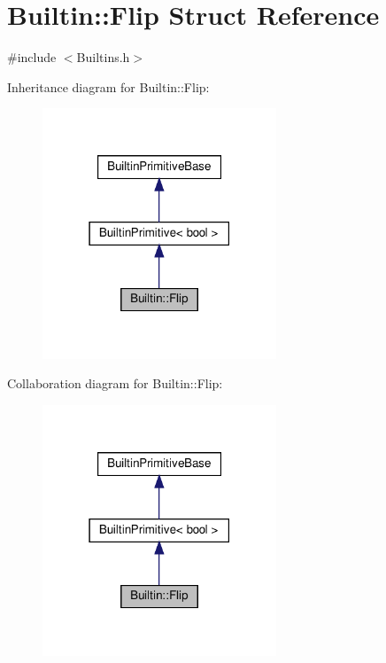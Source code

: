 \hypertarget{struct_builtin_1_1_flip}{}\section{Builtin\+:\+:Flip Struct Reference}
\label{struct_builtin_1_1_flip}


{\ttfamily \#include $<$Builtins.\+h$>$}



Inheritance diagram for Builtin\+:\+:Flip\+:\nopagebreak
\begin{figure}[H]
\begin{center}
\leavevmode
\includegraphics[width=198pt]{struct_builtin_1_1_flip__inherit__graph}
\end{center}
\end{figure}


Collaboration diagram for Builtin\+:\+:Flip\+:\nopagebreak
\begin{figure}[H]
\begin{center}
\leavevmode
\includegraphics[width=198pt]{struct_builtin_1_1_flip__coll__graph}
\end{center}
\end{figure}
